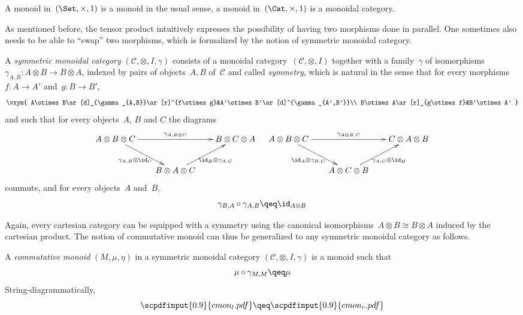 \documentclass{LMCS}
\newcommand{\strid}[1]{\scpdfinput{0.9}{#1.pdf}}
\renewcommand{\C}{\mathcal{C}}
\begin{document}
\begin{exa}
  A monoid in~$(\Set,\times,1)$ is a monoid in the usual sense, a monoid
  in~$(\Cat,\times,1)$ is a monoidal category.
\end{exa}

As mentioned before, the tensor product intuitively expresses the possibility of
having two morphisms done in parallel. One sometimes also needs to be able to
``swap'' two morphisms, which is formalized by the notion of symmetric monoidal
category.

\begin{defi}
  A \emph{symmetric monoidal category} $(\C,\otimes,I,\gamma)$ consists of a
  monoidal category~$(\C,\otimes,I)$ together with a family~$\gamma$ of
  isomorphisms~$\gamma_{A,B}:A\otimes B\to B\otimes A$, indexed by pairs of
  objects~$A,B$ of~$\C$ and called \emph{symmetry}, which is natural in the
  sense that for every morphisms~$f:A\to A'$ and~$g:B\to B'$,
  \[
  \vxym{
    A\otimes B\ar[d]_{\gamma_{A,B}}\ar[r]^{f\otimes g}&A'\otimes B'\ar[d]^{\gamma_{A',B'}}\\
    B\otimes A\ar[r]_{g\otimes f}&B'\otimes A'
  }
  \]
  and such that for every objects~$A$, $B$ and $C$ the diagrams
  \[
  \xymatrix@C-6 pt{A\otimes B\otimes C\ar[rr]^{\gamma_{A,B\otimes C}}\ar[dr]_{\gamma_{A,B}\otimes\id_C}&&B\otimes C\otimes A\\
    &B\otimes A\otimes C\ar[ur]_{\id_B\otimes\gamma_{A,C}}&
  }
  \quad
  \xymatrix@C-6 pt{A\otimes B\otimes C\ar[dr]_{\id_A\otimes\gamma_{B,C}}\ar[rr]^{\gamma_{A\otimes B,C}}&&C\otimes A\otimes B\\
    &A\otimes C\otimes B\ar[ur]_{\gamma_{A,C}\otimes \id_B}&
  }
  \]
  commute, and for every objects~$A$ and~$B$,
  \[
  \gamma_{B,A}\circ\gamma_{A,B}\qeq\id_{A\otimes B}
  \]
\end{defi}

Again, every cartesian category can be equipped with a symmetry using the
canonical isomorphisms~$A\otimes B\cong B\otimes A$ induced by the cartesian product. The
notion of commutative monoid can thus be generalized to any symmetric monoidal
category as follows.

\begin{defi}
  A \emph{commutative monoid} $(M,\mu,\eta)$ in a symmetric monoidal
  category $(\C,\otimes,I,\gamma)$ is a monoid such that
  \[
  \mu\circ\gamma_{M,M}\qeq\mu
  \]
  String-diagrammatically,
  \[
  \strid{cmon_l}
  \qeq
  \strid{cmon_r}
  \]
\end{defi}
\end{document}

